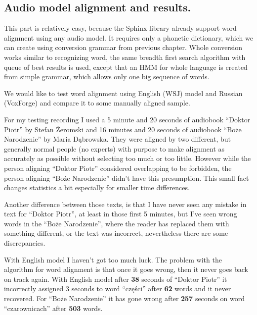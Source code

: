 \documentclass[12pt,a4paper,english]{article}
\begin{document}
\newpage
\subsection{Audio model alignment and results.}

This part is relatively easy, because the Sphinx library already support word alignment using any audio model. It requires only a phonetic dictionary, which we can create using conversion grammar from previous chapter.  Whole conversion works similar to recognizing word, the same breadth first search algorithm with queue of best results is used, except that an HMM for whole language is created from simple grammar, which allows only one big sequence of words. \newline

We would like to test word alignment using English (WSJ) model and Russian (VoxForge) and compare it to some manually aligned sample. \newline

For my testing recording I used a 5 minute and 20 seconds of audiobook “Doktor Piotr” by Stefan Żeromski and 16 minutes and 20 seconds of audiobook “Boże Narodzenie” by Maria Dąbrowska. \newline
They were aligned by two different, but generally normal people (no experts) with purpose to make alignment as accurately as possible without selecting too much or too little. However while the person aligning “Doktor Piotr” considered overlapping to be forbidden, the person aligning “Boże Narodzenie” didn't have this presumption. This small fact changes statistics a bit especially for smaller time differences. \newline

Another difference between those texts, is that I have never seen any mistake in text for “Doktor Piotr”, at least in those first 5 minutes, but I've seen wrong words in the “Boże Narodzenie”, where the reader has replaced them with something different, or the text was incorrect, nevertheless there are some discrepancies. \newline

\newpage

With English model I haven't got too much luck. The problem with the algorithm for word alignment is that once it goes wrong, then it never goes back on track again. With English model after \textbf{38} seconds of “Doktor Piotr” it incorrectly assigned 3 seconds to word “części” after \textbf{62} words and it never recovered. For “Boże Narodzenie” it has gone wrong after \textbf{257} seconds on word “czarownicach” after \textbf{503} words. \newline
\end{document}

